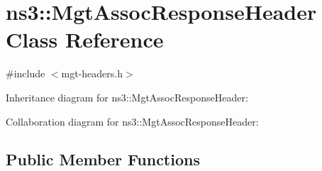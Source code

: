 \hypertarget{classns3_1_1MgtAssocResponseHeader}{}\section{ns3\+:\+:Mgt\+Assoc\+Response\+Header Class Reference}
\label{classns3_1_1MgtAssocResponseHeader}


{\ttfamily \#include $<$mgt-\/headers.\+h$>$}



Inheritance diagram for ns3\+:\+:Mgt\+Assoc\+Response\+Header\+:


Collaboration diagram for ns3\+:\+:Mgt\+Assoc\+Response\+Header\+:
\subsection*{Public Member Functions}
